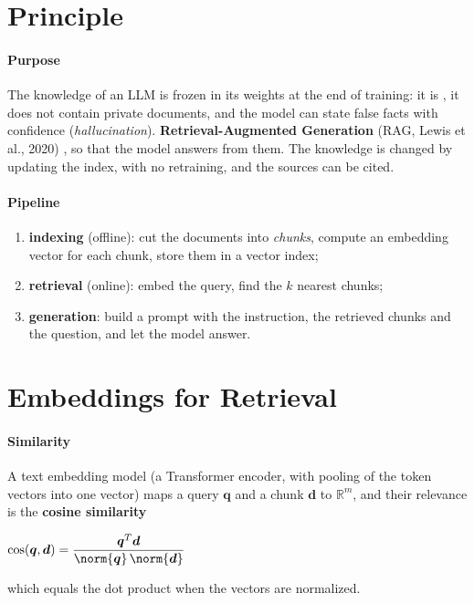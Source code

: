 \section{Principle}
\paragraph{Purpose}
The knowledge of an LLM is frozen in its weights at the end of training: it is
, it does not contain private documents, and the model can state false facts
with confidence (\emph{hallucination}). \textbf{Retrieval-Augmented Generation} (RAG, Lewis et
al., 2020) , so
that the model answers from them. The knowledge is changed by updating the index, with no
retraining, and the sources can be cited.

\paragraph{Pipeline}
\begin{enumerate}
    \item \textbf{indexing} (offline): cut the documents into \emph{chunks}, compute an
        embedding vector for each chunk, store them in a vector index;
    \item \textbf{retrieval} (online): embed the query, find the $k$ nearest chunks;
    \item \textbf{generation}: build a prompt with the instruction, the retrieved chunks and
        the question, and let the model answer.
\end{enumerate}

\section{Embeddings for Retrieval}
\paragraph{Similarity}
A text embedding model (a Transformer encoder, with pooling of the token vectors into one
vector) maps a query $\bm{q}$ and a chunk $\bm{d}$ to $\mathbb{R}^{m}$, and their relevance
is the \textbf{cosine similarity}
\begin{center}
    $\cos(\bm{q},\bm{d})=\dfrac{\bm{q}^{T}\bm{d}}{\norm{\bm{q}}\,\norm{\bm{d}}}$
\end{center}
which equals the dot product when the vectors are normalized.

